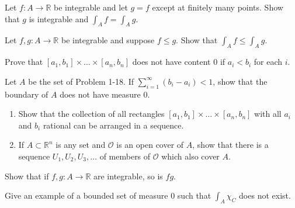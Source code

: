 \documentclass[12 pt, letterpaper]{hmcpset}
\begin{document}
\begin{problem}[2.]
	Let $f: A \to \mathbb{R}$ be integrable and let $g = f$ except at finitely many points. Show that $g$ is integrable and $\int_{A} f = \int_{A} g $.
\end{problem}

\pagebreak

\begin{problem}[5.]
	Let $f, g: A \to \mathbb{R}$ be integrable and suppose $f \le g$. Show that $\int_{A} f \le \int_{A} g$.
\end{problem}

\pagebreak

\begin{problem}[8.]
	Prove that $[a_{1}, b_{1}] \times \dots \times [a_{n}, b_{n}]$ does not have content $0$ if $a_{i} < b_{i}$ for each $i$.
\end{problem}

\pagebreak

\begin{problem}[11]
	Let $A$ be the set of Problem 1-18. If $\sum_{i = 1}^{\infty} (b_{i} - a_{i}) < 1$, show that the boundary of $A$ does not have measure $0$.
\end{problem}

\pagebreak

\begin{problem}[13.]
	\begin{enumerate}
		\item Show that the collection of all rectangles $[a_{1}, b_{1}] \times \dots \times [a_{n}, b_{n}]$ with all $a_{i}$ and $b_{i}$ rational can be arranged in a sequence.
		\item If $A \subset \mathbb{R}^{n}$ is any set and $\mathcal{O}$ is an open cover of $A$, show that there is a sequence $U_{1}, U_{2}, U_{3}, \dots$ of members of $\mathcal{O}$ which also cover $A$.
	\end{enumerate}
\end{problem}

\pagebreak

\begin{problem}[14.]
	Show that if $f, g : A \to \mathbb{R}$ are integrable, so is $f g$.
\end{problem}

\pagebreak

\begin{problem}[15.]
	Give an example of a bounded set of measure $0$ such that $\int_{A} \chi_{C}$ does not exist.
\end{problem}
\end{document}
